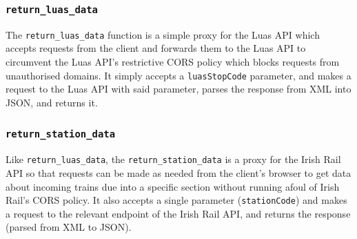 \documentclass[a4paper,11pt]{report}
\begin{document}
\subsubsection{\texttt{return_luas_data}}
The \verb|return_luas_data| function is a simple proxy for the Luas API which accepts requests from the client and forwards them to the Luas API to circumvent the Luas API's restrictive CORS policy which blocks requests from unauthorised domains.
It simply accepts a \verb|luasStopCode| parameter, and makes a request to the Luas API with said parameter, parses the response from XML into JSON, and returns it.

\subsubsection{\texttt{return_station_data}}
Like \verb|return_luas_data|, the \verb|return_station_data| is a proxy for the Irish Rail API so that requests can be made as needed from the client's browser to get data about incoming trains due into a specific section without running afoul of Irish Rail's CORS policy.
It also accepts a single parameter (\verb|stationCode|) and makes a request to the relevant endpoint of the Irish Rail API, and returns the response (parsed from XML to JSON).
\end{document}
